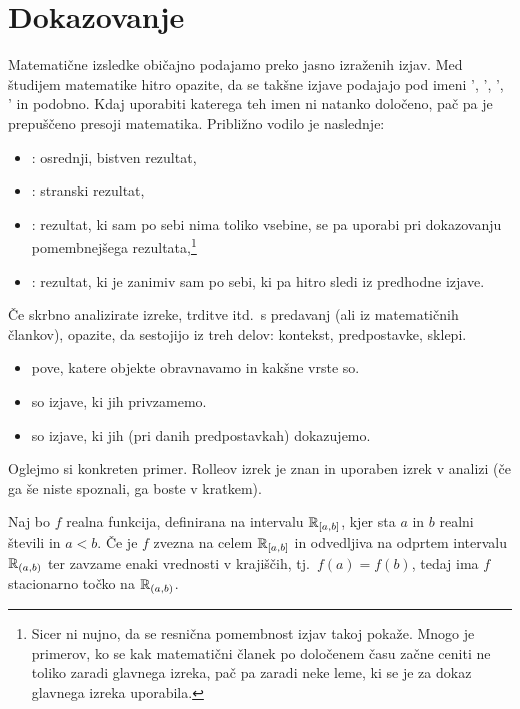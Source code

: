 \chapter{Dokazovanje}\label{POGLAVJE: Dokazovanje}

	Matematične izsledke običajno podajamo preko jasno izraženih izjav. Med študijem matematike hitro opazite, da se takšne izjave podajajo pod imeni ', ', ', ' in podobno. Kdaj uporabiti katerega teh imen ni natanko določeno, pač pa je prepuščeno presoji matematika. Približno vodilo je naslednje:
	\begin{itemize}
		\item
			: osrednji, bistven rezultat,
		\item
			: stranski rezultat,
		\item
			: rezultat, ki sam po sebi nima toliko vsebine, se pa uporabi pri dokazovanju pomembnejšega rezultata,\footnote{Sicer ni nujno, da se resnična pomembnost izjav takoj pokaže. Mnogo je primerov, ko se kak matematični članek po določenem času začne ceniti ne toliko zaradi glavnega izreka, pač pa zaradi neke leme, ki se je za dokaz glavnega izreka uporabila.}
		\item
			: rezultat, ki je zanimiv sam po sebi, ki pa hitro sledi iz predhodne izjave.
	\end{itemize}
	
	Če skrbno analizirate izreke, trditve itd.~s predavanj (ali iz matematičnih člankov), opazite, da sestojijo iz treh delov: kontekst, predpostavke, sklepi.
	\begin{itemize}
		\item
			 pove, katere objekte obravnavamo in kakšne vrste so.
		\item
			 so izjave, ki jih privzamemo.
		\item
			 so izjave, ki jih (pri danih predpostavkah) dokazujemo.
	\end{itemize}
	
	Oglejmo si konkreten primer. Rolleov izrek je znan in uporaben izrek v analizi (če ga še niste spoznali, ga boste v kratkem).
	
	\begin{izrek}[Rolle]
		Naj bo $f$ realna funkcija, definirana na intervalu ${\mathbb{R}}_{[a, b]}$, kjer sta $a$ in $b$ realni števili in $a < b$. Če je $f$ zvezna na celem ${\mathbb{R}}_{[a, b]}$ in odvedljiva na odprtem intervalu ${\mathbb{R}}_{(a, b)}$ ter zavzame enaki vrednosti v krajiščih, tj.~$f(a) = f(b)$, tedaj ima $f$ stacionarno točko na ${\mathbb{R}}_{(a, b)}$.
	\end{izrek}
	
